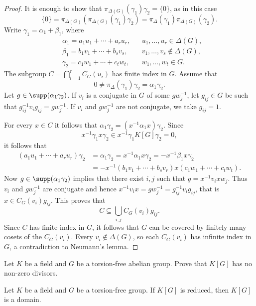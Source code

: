 \begin{proof}
	It is enough to show that $\pi_{\Delta(G)}(\gamma_1)\gamma_2=\{0\}$, 
	as in this case
	\[
		\{0\}=\pi_{\Delta(G)}(\pi_{\Delta(G)}(\gamma_1)\gamma_2)=\pi_{\Delta}(\gamma_1)\pi_{\Delta(G)}(\gamma_2).
	\]
	Write $\gamma_1=\alpha_1+\beta_1$, where 
	\begin{align*}
		&\alpha_1=a_1u_1+\cdots+a_ru_r, && u_1,\dots,u_r\in\Delta(G),\\
		&\beta_1=b_1v_1+\cdots+b_sv_s, && v_1,\dots,v_s\not\in\Delta(G),\\
		&\gamma_2=c_1w_1+\cdots+c_tw_t,&& w_1,\dots,w_t\in G.
	\end{align*}
	The subgroup $C=\bigcap_{i=1}^rC_G(u_i)$ has finite index in $G$.
	Assume that 
	\[
		0\ne \pi_{\Delta}(\gamma_1)\gamma_2=\alpha_1\gamma_2. 
	\]
	Let $g\in\supp(\alpha_1\gamma_2)$. 
	If $v_i$ is a conjugate in $G$ of some 
	$gw_j^{-1}$, let $g_{ij}\in G$ be such that
	$g_{ij}^{-1}v_ig_{ij}=gw_j^{-1}$. If $v_i$ and $gw_j^{-1}$ 
	are not conjugate, 
	we take $g_{ij}=1$. 

	For every $x\in C$ it follows that
	$\alpha_1\gamma_2=(x^{-1}\alpha_1x)\gamma_2$. Since  
	\[
		x^{-1}\gamma_1x\gamma_2\in x^{-1}\gamma_1K[G]\gamma_2=0,
	\]
	it follows that
	\begin{align*}
		(a_1u_1+\cdots+a_ru_r)\gamma_2&=
		\alpha_1\gamma_2=x^{-1}\alpha_1x\gamma_2=-x^{-1}\beta_1x\gamma_2\\
		&=-x^{-1}(b_1v_1+\cdots+b_sv_r)x(c_1w_1+\cdots+c_tw_t).
	\end{align*}
	Now $g\in\supp(\alpha_1\gamma_2)$ implies that there exist $i,j$ such that
	$g=x^{-1}v_ixw_j$.
	Thus $v_i$ and $gw_j^{-1}$ are conjugate and hence
	$x^{-1}v_ix=gw_j^{-1}=g_{ij}^{-1}v_ig_{ij}$, that is
	$x\in C_G(v_i)g_{ij}$. This proves that 
	\[
		C\subseteq\bigcup_{i,j}C_G(v_i)g_{ij}. 
	\]
	Since $C$ has finite index in $G$, it follows that 
	$G$ can be covered by finitely many cosets of 
	the $C_G(v_i)$. Every $v_i\not\in\Delta(G)$, so 
	each $C_G(v_i)$ has infinite index in $G$, a contradiction 
	to Neumann's lemma.
\end{proof}


\begin{exercise}
    Let $K$ be a field and $G$ be a torsion-free abelian group. Prove that 
    $K[G]$ has no non-zero divisors. 
\end{exercise}


\begin{theorem}[Passman]
\label{thm:Passman}
	Let $K$ be a field and $G$ be a torsion-free group. If 
	$K[G]$ is reduced, then $K[G]$ is a domain.
\end{theorem}


